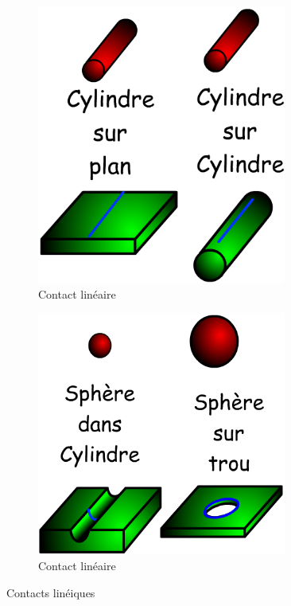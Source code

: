 \documentclass[10pt,fleqn,draft]{article} %
\begin{document}
\begin{figure}[h]
  \begin{subfigure}[b]{0.5\textwidth}
    \centering
    \includegraphics[width=0.9\textwidth,height=.2\textheight,keepaspectratio]{images/lineaire_rectiligne}
    \caption{Contact linéaire }
  \end{subfigure}\hfill
  \begin{subfigure}[b]{0.5\textwidth}
    \centering
    \includegraphics[width=0.9\textwidth,height=.2\textheight,keepaspectratio]{images/lineaire_annulaire}
    \caption{Contact linéaire }
  \end{subfigure}\hfill
  \caption{Contacts linéiques}
  \label{fig:surfacique}
\end{figure}
\end{document}
